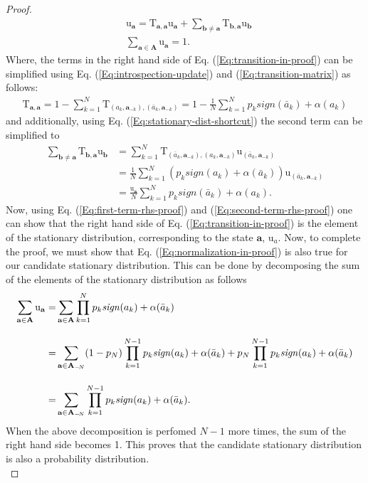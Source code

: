 \documentclass[11pt]{article}
\theoremstyle{plainCl1}
\theoremstyle{plainCl2}
\newcommand{\A}{\mathbf{A}}
\newcommand{\abf}{\mathbf{a}}
\newcommand{\bbf}{\mathbf{b}}
\begin{document}
\begin{proof}
\begin{align}
\label{Eq:transition-in-proof}
&\mathrm{u}_\abf = \mathrm{T}_{\abf,\abf} \mathrm{u}_\abf  + \sum_{\bbf \neq \abf} \mathrm{T}_{\bbf, \abf} \mathrm{u}_{\bbf}  \\[10pt] 
\label{Eq:normalization-in-proof}
&\sum_{\abf \in \A} \mathrm{u}_{\abf}= 1 .
\end{align}
Where, the terms in the right hand side of Eq. (\ref{Eq:transition-in-proof}) can be simplified using Eq. (\ref{Eq:introspection-update}) and (\ref{Eq:transition-matrix}) as follows:
\begin{eqnarray}
\mathrm{T}_{\abf,\abf} = 1 - \sum_{k=1}^{N} \mathrm{T}_{(a_k, \abf_{-k}), (\bar{a}_k,\abf_{-k})} = 1 - \frac{1}{N} \sum_{k=1}^{N} p_k \textit{sign}(\bar{a}_k) + \alpha(a_k)
\label{Eq:first-term-rhs-proof}
\end{eqnarray} 
and additionally, using Eq. (\ref{Eq:stationary-dist-shortcut}) the second term can be simplified to
\begin{align}
\sum_{\bbf \neq \abf} \mathrm{T}_{\bbf, \abf} \mathrm{u}_{\bbf} &= \sum_{k = 1}^N \mathrm{T}_{(\bar{a}_k,\abf_{-k}), (a_k, \abf_{-k})} \mathrm{u}_{(\bar{a}_k,\abf_{-k})} \\[10pt]
&= \frac{1}{N} \sum_{k = 1}^N \left(p_k \textit{sign}(a_k) +\alpha(\bar{a}_k) \right) \mathrm{u}_{(\bar{a}_k,\abf_{-k})} \\[10pt] 
\label{Eq:second-term-rhs-proof}
&= \frac{\mathrm{u}_\abf}{N} \sum_{k=1}^{N} p_k \textit{sign}(\bar{a}_k) + \alpha(a_k) .
\end{align}
Now, using Eq. (\ref{Eq:first-term-rhs-proof}) and (\ref{Eq:second-term-rhs-proof}) one can show that the right hand side of Eq. (\ref{Eq:transition-in-proof}) is the element of the stationary distribution, corresponding to the state $\abf$, $\mathrm{u}_a$.  Now, to complete the proof, we must show that Eq. (\ref{Eq:normalization-in-proof}) is also true for our candidate stationary distribution. This can be done by decomposing the sum of the elements of the stationary distribution as follows
\begin{align}
\sum_{\abf \in \A} \mathrm{u}_{\abf} =& \displaystyle \sum_{\abf \in \A} \prod_{k=1}^N p_k \mathit{sign}(a_k) + \alpha(\bar{a}_k) \\[10pt]
=& \displaystyle \displaystyle \sum_{\abf \in \A_{-\!N}} (1-p_N)  \prod_{k=1}^{N-1} p_k \mathit{sign}(a_k) + \alpha(\bar{a}_k)  + p_N  \prod_{k=1}^{N-1} p_k \mathit{sign}(a_k) + \alpha(\bar{a}_k) \\[10pt]
=& \displaystyle \sum_{\abf \in \A_{-\!N}} \prod_{k=1}^{N-1} p_k \mathit{sign}(a_k) + \alpha(\bar{a}_k) .
\end{align}
When the above decomposition is perfomed $N-1$ more times, the sum of the right hand side becomes 1. This proves that the candidate stationary distribution is also a probability distribution.\\
\end{proof}
\end{document}
